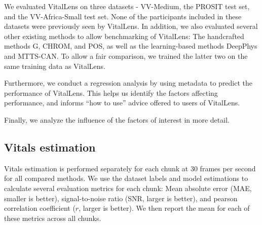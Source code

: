 \documentclass{article}
\begin{document}
We evaluated VitalLens on three datasets - VV-Medium, the PROSIT test set, and the VV-Africa-Small test set.
None of the participants included in these datasets were previously seen by VitalLens.
In addition, we also evaluated several other existing methods to allow benchmarking of VitalLens:
The handcrafted methods G, CHROM, and POS, as well as the learning-based methods DeepPhys and MTTS-CAN.
To allow a fair comparison, we trained the latter two on the same training data as VitalLens.

Furthermore, we conduct a regression analysis by using metadata to predict the performance of VitalLens.
This helps us identify the factors affecting performance, and informs ``how to use'' advice offered to users of VitalLens.

Finally, we analyze the influence of the factors of interest in more detail.

\subsection{Vitals estimation}

Vitals estimation is performed separately for each chunk at 30 frames per second for all compared methods.
We use the dataset labels and model estimations to calculate several evaluation metrics for each chunk:
Mean absolute error (MAE, smaller is better), signal-to-noise ratio (SNR, larger is better), and pearson correlation coefficient ($r$, larger is better).
We then report the mean for each of these metrics across all chunks.

\newcommand{\printMetric}[1]{%
  \ifthenelse{\equal{#1}{0.0}}%
    {--}%
    {\sisetup{round-mode=places,round-precision=2}\num{#1}}%
}
\end{document}
